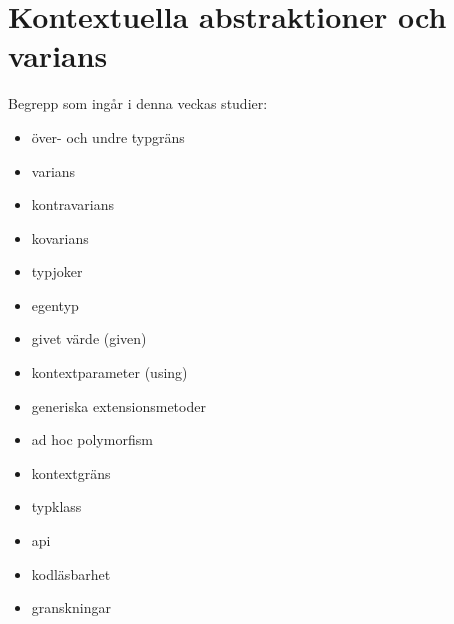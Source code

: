 \chapter{Kontextuella abstraktioner och varians}\label{chapter:W11}
Begrepp som ingår i denna veckas studier:
\begin{itemize}[noitemsep,label={$\square$},leftmargin=*]
\item över- och undre typgräns
\item varians
\item kontravarians
\item kovarians
\item typjoker
\item egentyp
\item givet värde (given)
\item kontextparameter (using)
\item generiska extensionsmetoder
\item ad hoc polymorfism
\item kontextgräns
\item typklass
\item api
\item kodläsbarhet
\item granskningar\end{itemize}
